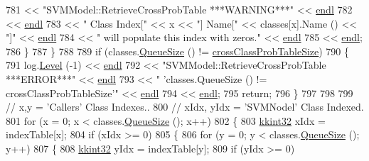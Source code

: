 \begin{DoxyCode}
781                      << \textcolor{stringliteral}{"SVMModel::RetrieveCrossProbTable   ***WARNING***"} << 
      \hyperlink{namespace_k_k_b_ad1f50f65af6adc8fa9e6f62d007818a8}{endl}
782                      << \hyperlink{namespace_k_k_b_ad1f50f65af6adc8fa9e6f62d007818a8}{endl}
783                      << \textcolor{stringliteral}{"      Class Index["} << x << \textcolor{stringliteral}{"]  Name["} << classes[x].Name () << \textcolor{stringliteral}{"]"} << 
      \hyperlink{namespace_k_k_b_ad1f50f65af6adc8fa9e6f62d007818a8}{endl}
784                      << \textcolor{stringliteral}{"      will populate this index with zeros."}                         << 
      \hyperlink{namespace_k_k_b_ad1f50f65af6adc8fa9e6f62d007818a8}{endl}
785                      << \hyperlink{namespace_k_k_b_ad1f50f65af6adc8fa9e6f62d007818a8}{endl};
786     \}
787   \}
788 
789   \textcolor{keywordflow}{if}  (classes.\hyperlink{class_k_k_b_1_1_k_k_queue_a1dab601f75ee6a65d97f02bddf71c40d}{QueueSize} () != \hyperlink{class_k_k_m_l_l_1_1_model_a6e6436028d45da095f732b4bf7835101}{crossClassProbTableSize})
790   \{
791     log.\hyperlink{class_k_k_b_1_1_run_log_a32cf761d7f2e747465fd80533fdbb659}{Level} (-1) << \hyperlink{namespace_k_k_b_ad1f50f65af6adc8fa9e6f62d007818a8}{endl}
792                    << \textcolor{stringliteral}{"SVMModel::RetrieveCrossProbTable   ***ERROR***"}                                     
        << \hyperlink{namespace_k_k_b_ad1f50f65af6adc8fa9e6f62d007818a8}{endl}
793                    << \textcolor{stringliteral}{"                                  'classes.QueueSize () != crossClassProbTableSize'"}
        << \hyperlink{namespace_k_k_b_ad1f50f65af6adc8fa9e6f62d007818a8}{endl}
794                    << \hyperlink{namespace_k_k_b_ad1f50f65af6adc8fa9e6f62d007818a8}{endl};
795     \textcolor{keywordflow}{return};
796   \}
797 
798 
799   \textcolor{comment}{// x,y         = 'Callers'   Class Indexes..}
800   \textcolor{comment}{// xIdx, yIdx  = 'SVMNodel'  Class Indexed.}
801   \textcolor{keywordflow}{for}  (x = 0;  x < classes.\hyperlink{class_k_k_b_1_1_k_k_queue_a1dab601f75ee6a65d97f02bddf71c40d}{QueueSize} ();  x++)
802   \{
803     \hyperlink{namespace_k_k_b_a8fa4952cc84fda1de4bec1fbdd8d5b1b}{kkint32} xIdx = indexTable[x];
804     \textcolor{keywordflow}{if}  (xIdx >= 0)
805     \{
806       \textcolor{keywordflow}{for}  (y = 0;  y < classes.\hyperlink{class_k_k_b_1_1_k_k_queue_a1dab601f75ee6a65d97f02bddf71c40d}{QueueSize} ();  y++)
807       \{
808         \hyperlink{namespace_k_k_b_a8fa4952cc84fda1de4bec1fbdd8d5b1b}{kkint32}  yIdx = indexTable[y];
809         \textcolor{keywordflow}{if}  (yIdx >= 0)

\end{DoxyCode}
